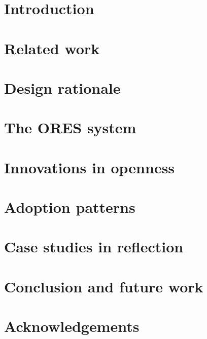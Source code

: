 \section{Introduction}
\label{sec:introduction}


\section{Related work}
\label{sec:related_work}


\section{Design rationale}
\label{sec:design_rationale}


\section{The ORES system}
\label{sec:the_ores_system}


\section{Innovations in openness}
\label{sec:innovations_in_openness}


\section{Adoption patterns}
\label{sec:adoption_patterns}


\section{Case studies in reflection}
\label{sec:case_studies}


\section{Conclusion and future work}
\label{sec:conclusions_and_future_work}


\section{Acknowledgements}
\label{sec:acknowledgements}




